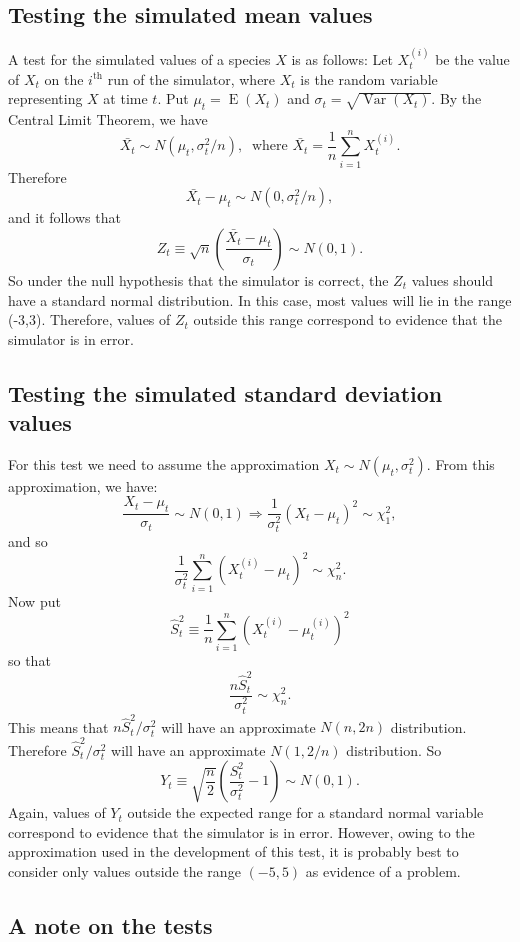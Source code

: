 \documentclass[12pt,a4paper]{article}
\begin{document}
\subsection{Testing the simulated mean values}

A test for the simulated values of a species $X$ is as follows: Let
$X_t^{(i)}$ be the value of $X_t$ on the $i^{\mbox{th}}$ run of the
simulator, where $X_t$ is the random variable representing $X$ at time
$t$. Put $\mu_t=\operatorname{E}(X_t)$ and
$\sigma_t=\sqrt{\operatorname{Var}(X_t)}$. By the Central Limit
Theorem, we have
\[
\bar{X_t} \sim N( \mu_t, \sigma_t^2/n ),\ 
\text{ where }
\bar{X_t}=\frac{1}{n}\sum_{i=1}^n X_t^{(i)}.
\]
Therefore
\[
\bar{X_t}-\mu_t \sim N(0,\sigma_t^2/n),
\]
and it follows that
\[
Z_t \equiv \sqrt{n}\left( \frac{\bar{X_t} -\mu_t}{\sigma_t}\right)\sim N(0,1).
\]
So under the null hypothesis that the simulator is correct, the $Z_t$
values should have a standard normal distribution. In this case, most
values will lie in the range (-3,3). Therefore, values of $Z_t$
outside this range correspond to evidence that the simulator is in
error.

\subsection{Testing the simulated standard deviation values}

For this test we need to assume the approximation $X_t\sim
N(\mu_t,\sigma_t^2)$. From this approximation, we have:
\[
\frac{X_t-\mu_t}{\sigma_t} \sim N(0,1) \Rightarrow\frac{1}{\sigma_t^2}(X_t-\mu_t)^2 \sim \chi^2_1,
\]
and so
\[
\frac{1}{\sigma_t^2}\sum_{i=1}^n (X_t^{(i)}-\mu_t)^2 \sim \chi^2_n.
\]
Now put
\[
\hat{S}_t^2 \equiv \frac{1}{n}\sum_{i=1}^n(X_t^{(i)}-\mu_t^{(i)})^2
\]
so that
\[
\frac{n\hat{S}_t^2}{\sigma_t^2} \sim \chi^2_n.
\]
This means that $n\hat{S}_t^2/\sigma_t^2$ will have an approximate
$N(n,2n)$ distribution. Therefore $\hat{S}_t^2/\sigma_t^2$ will have
an approximate $ N(1,2/n)$ distribution. So
\[
Y_t \equiv \sqrt{\frac{n}{2}}\left(\frac{S_t^2}{\sigma_t^2} - 1\right)\sim N(0,1).
\]
Again, values of $Y_t$ outside the expected range for a standard
normal variable correspond to evidence that the simulator is in
error. However, owing to the approximation used in the development of
this test, it is probably best to consider only values outside the
range $(-5,5)$ as evidence of a problem.

\subsection{A note on the tests}
\end{document}
